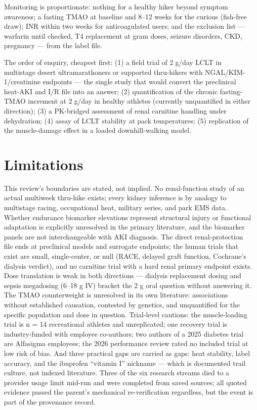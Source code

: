 Monitoring is proportionate: nothing for a healthy hiker beyond symptom awareness; a fasting TMAO at baseline and 8--12 weeks for the curious (fish-free draw); INR within two weeks for anticoagulated users; and the exclusion list --- warfarin until checked, T4 replacement at gram doses, seizure disorders, CKD, pregnancy --- from the label file.

The order of enquiry, cheapest first: (1) a field trial of 2 g/day LCLT in multistage desert ultramarathoners or supported thru-hikers with NGAL/KIM-1/creatinine endpoints --- the single study that would convert the preclinical heat-AKI and I/R file into an answer; (2) quantification of the chronic fasting-TMAO increment at 2 g/day in healthy athletes (currently unquantified in either direction); (3) a PK-bridged assessment of renal carnitine handling under dehydration; (4) assay of LCLT stability at pack temperatures; (5) replication of the muscle-damage effect in a loaded downhill-walking model.

\section{Limitations}
\label{sec:limits}

This review's boundaries are stated, not implied. No renal-function study of an actual multiweek thru-hike exists; every kidney inference is by analogy to multistage racing, occupational heat, military series, and park EMS data. Whether endurance biomarker elevations represent structural injury or functional adaptation is explicitly unresolved in the primary literature, and the biomarker panels are not interchangeable with AKI diagnosis. The direct renal-protection file ends at preclinical models and surrogate endpoints; the human trials that exist are small, single-center, or null (RACE, delayed graft function, Cochrane's dialysis verdict), and no carnitine trial with a hard renal primary endpoint exists. Dose translation is weak in both directions --- dialysis replacement dosing and sepsis megadosing (6--18 g IV) bracket the 2 g oral question without answering it. The TMAO counterweight is unresolved in its own literature: associations without established causation, contested by genetics, and unquantified for the specific population and dose in question. Trial-level cautions: the muscle-loading trial is n = 14 recreational athletes and unreplicated; one recovery trial is industry-funded with employee co-authors; two authors of a 2025 diabetes trial are Alfasigma employees; the 2026 performance review rated no included trial at low risk of bias. And three practical gaps are carried as gaps: heat stability, label accuracy, and the ibuprofen ``vitamin I'' nickname --- which is documented trail culture, not indexed literature. Three of the six research streams died to a provider usage limit mid-run and were completed from saved sources; all quoted evidence passed the parent's mechanical re-verification regardless, but the event is part of the provenance record.

